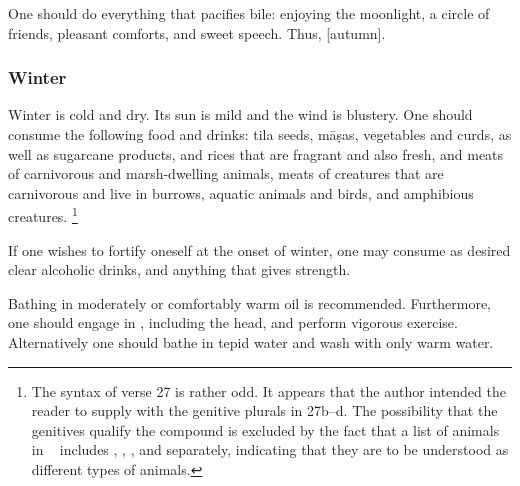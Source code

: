 \begin{translation}
	\item[25] %
	One should do everything that pacifies bile: enjoying the moonlight, a circle of friends, pleasant comforts, and sweet speech. Thus, [autumn].%

	\subsubsection{Winter} %

	\item[26--27]
	Winter is cold and dry. Its sun is mild and the wind is blustery. %
	One should consume the following food and drinks:
	\gls{tila} seeds,
	\glspl{māṣa},
	vegetables and curds, as well as
	sugarcane products, and
	rices that are fragrant and also fresh, %
	and meats %
	of carnivorous %
	and marsh-dwelling animals, %
	meats of
	creatures that are
	carnivorous and live in burrows, %
	aquatic animals and %
	birds, %
	and amphibious creatures.%
	\footnote{The syntax of verse 27 is rather odd. It appears that the author intended the reader to supply  with the genitive plurals in 27b–d. The possibility that the genitives qualify the compound  is excluded by the fact that a list of animals in  \SS\   includes , , , and  separately, indicating that they are to be understood as different types of animals.} %

	\item[28]
	If one wishes to fortify oneself at the onset of winter, %
	one may consume as desired %
	clear alcoholic drinks, %
	and anything that gives strength. %

	\item[29] %
	Bathing %
	in moderately or comfortably warm  %
	oil is recommended. %
	Furthermore, %
	one should engage in , including the head, and perform vigorous exercise.  Alternatively one should  bathe in tepid water and wash with only warm water.


\end{translation}
